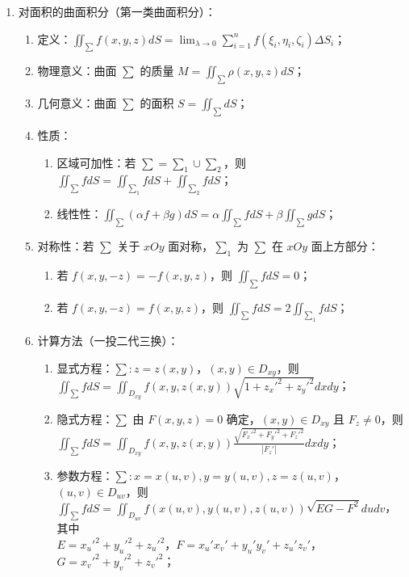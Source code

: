 \documentclass[UTF8]{ctexart}
\theoremstyle{remark}
\begin{document}
\begin{enumerate}
		\item 对面积的曲面积分（第一类曲面积分）：
		\begin{enumerate}
			\item 定义：\(\iint_{\sum} f(x, y, z)dS = \lim_{\lambda \to 0} \sum_{i=1}^{n} f(\xi_i, \eta_i, \zeta_i)\Delta S_i\)；
			\item 物理意义：曲面 \(\sum\) 的质量 \(M = \iint_{\sum} \rho(x, y, z)dS\)；
			\item 几何意义：曲面 \(\sum\) 的面积 \(S = \iint_{\sum} dS\)；
			\item 性质：
			\begin{enumerate}
				\item 区域可加性：若 \(\sum = \sum_1 \cup \sum_2\)，则 \(\iint_{\sum} f dS = \iint_{\sum_1} f dS + \iint_{\sum_2} f dS\)；
				\item 线性性：\(\iint_{\sum} (\alpha f + \beta g)dS = \alpha\iint_{\sum} f dS + \beta\iint_{\sum} g dS\)；
			\end{enumerate}
			\item 对称性：若 \(\sum\) 关于 \(xOy\) 面对称，\(\sum_1\) 为 \(\sum\) 在 \(xOy\) 面上方部分：
			\begin{enumerate}
				\item 若 \(f(x, y, -z) = -f(x, y, z)\)，则 \(\iint_{\sum} f dS = 0\)；
				\item 若 \(f(x, y, -z) = f(x, y, z)\)，则 \(\iint_{\sum} f dS = 2\iint_{\sum_1} f dS\)；
			\end{enumerate}
			\item 计算方法（一投二代三换）：
			\begin{enumerate}
				\item 显式方程：\(\sum: z = z(x, y)\)，\((x, y) \in D_{xy}\)，则 \(\iint_{\sum} f dS = \iint_{D_{xy}} f(x, y, z(x, y))\sqrt{1 + z_x'^2 + z_y'^2}dxdy\)；
				\item 隐式方程：\(\sum\) 由 \(F(x, y, z) = 0\) 确定，\((x, y) \in D_{xy}\) 且 \(F_z \neq 0\)，则\\ \(\iint_{\sum} f dS = \iint_{D_{xy}} f(x, y, z(x, y))\frac{\sqrt{F_x'^2 + F_y'^2 + F_z'^2}}{|F_z'|}dxdy\)；
				\item 参数方程：\(\sum: x = x(u, v), y = y(u, v), z = z(u, v)\)，\((u, v) \in D_{uv}\)，则\\ \(\iint_{\sum} f dS = \iint_{D_{uv}} f(x(u, v), y(u, v), z(u, v))\sqrt{EG - F^2}dudv\)，其中\\ \(E = x_u'^2 + y_u'^2 + z_u'^2\)，\(F = x_u'x_v' + y_u'y_v' + z_u'z_v'\)，\(G = x_v'^2 + y_v'^2 + z_v'^2\)；
			\end{enumerate}

\end{enumerate}
\end{enumerate}
\end{document}

